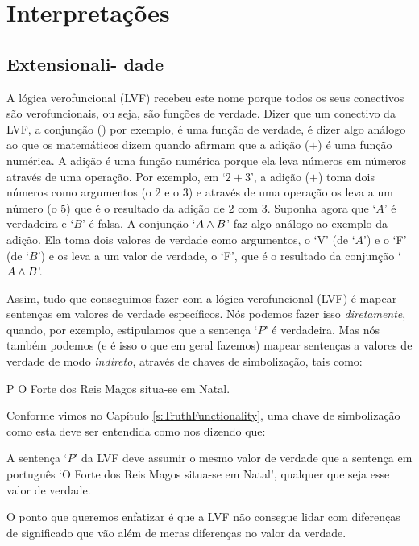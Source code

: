 \part{Interpretações}
\label{ch.semantics}


\chapter[Extensionalidade]{Extensionali- dade}\label{s:Interpretations}

A lógica verofuncional (LVF) recebeu este nome porque todos os seus conectivos são verofuncionais, ou seja, são funções de verdade.
Dizer que um conectivo da LVF, a conjunção (\eand) por exemplo, é uma função de verdade, é dizer algo análogo ao que os matemáticos dizem quando afirmam que a adição ($+$) é uma função numérica.
A adição é uma função numérica porque ela leva números em números através de uma operação.
Por exemplo, em  `$2+3$', a adição ($+$) toma dois números como argumentos (o $2$ e o $3$) e através de uma operação os leva a um número (o $5$) que é o resultado da adição de $2$ com $3$.
Suponha agora que `$A$' é verdadeira e `$B$' é falsa. A conjunção `$A\wedge B$' faz algo análogo ao exemplo da adição.
Ela toma dois valores de verdade como argumentos, o `V' (de `$A$') e o `F' (de `$B$') e os leva a um valor de verdade, o `F', que é o resultado da conjunção `$A\wedge B$'.

Assim, tudo que conseguimos fazer com a lógica verofuncional (LVF) é mapear sentenças em valores de verdade específicos.
Nós podemos fazer isso \emph{diretamente}, quando, por exemplo, estipulamos que a sentença `$P$' é verdadeira.
Mas nós também podemos (e é isso o que em geral fazemos) mapear sentenças a valores de verdade de modo \emph{indireto}, através de chaves de simbolização, tais como:
	\begin{ekey}
		\item[P] O Forte dos Reis Magos situa-se em Natal.
	\end{ekey}
Conforme vimos no Capítulo \ref{s:TruthFunctionality}, uma chave de simbolização como esta deve ser entendida como nos dizendo que:
	\begin{ebullet}
		\item A sentença `$P$' da LVF deve assumir o mesmo valor de verdade que a sentença em português `O Forte dos Reis Magos situa-se em Natal', qualquer que seja esse valor de verdade.
	\end{ebullet}
O ponto que queremos enfatizar é que a LVF não consegue lidar com diferenças de significado que vão além de meras diferenças no valor da verdade.


